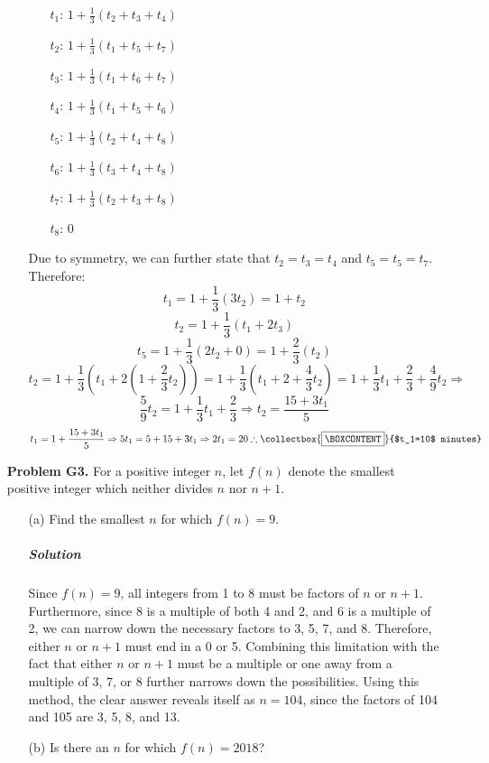 \documentclass[10pt,a4paper]{article}
\newcommand{\mybox}{%
	\collectbox{%
		\setlength{\fboxsep}{3pt}%
		\fbox{\BOXCONTENT}%
	}%
}
\begin{document}
\begin{itemize}
\begin{enumerate}
			\begin{itemize}
				\item[$t_1$:] 
				$1 + \frac{1}{3}(t_2+t_3+t_4)$
				\item[$t_2$:] 
				$1 + \frac{1}{3}(t_1+t_5+t_7)$
				\item[$t_3$:] 
				$1 + \frac{1}{3}(t_1+t_6+t_7)$
				\item[$t_4$:] 
				$1 + \frac{1}{3}(t_1+t_5+t_6)$
				\item[$t_5$:] 
				$1 + \frac{1}{3}(t_2+t_4+t_8)$
				\item[$t_6$:] 
				$1 + \frac{1}{3}(t_3+t_4+t_8)$
				\item[$t_7$:] 
				$1 + \frac{1}{3}(t_2+t_3+t_8)$
				\item[$t_8$:] 
				$0$
			\end{itemize}
		
			Due to symmetry, we can further state that $t_2=t_3=t_4$ and $t_5=t_5=t_7$. Therefore:
			\[ t_1=1+\frac{1}{3}(3t_2)=1+t_2 \]
			\[ t_2=1+\frac{1}{3}(t_1+2t_3) \]
			\[ t_5=1+\frac{1}{3}(2t_2+0)=1+\frac{2}{3}(t_2) \]
			\[ t_2=1+\frac{1}{3}(t_1+2(1+\frac{2}{3}t_2))=1+\frac{1}{3}(t_1+2+\frac{4}{3}t_2)=1+\frac{1}{3}t_1+\frac{2}{3}+\frac{4}{9}t_2\Rightarrow \]
			\[ \frac{5}{9}t_2=1+\frac{1}{3}t_1+\frac{2}{3}\Rightarrow t_2=\frac{15+3t_1}{5} \]
			\[ t_1=1+\frac{15+3t_1}{5}\Rightarrow 5t_1=5+15+3t_1\Rightarrow 2t_1=20\therefore \mybox{$t_1=10$ minutes} \]
		\end{enumerate}
	
		\item[\textbf{Problem G3.}] For a positive integer $n$, let $f(n)$ denote the smallest positive integer which neither divides $n$ nor $n+1$.
		
		\begin{enumerate}
			\item[(a)] Find the smallest $n$ for which $f(n)=9$.
			
			\subparagraph{Solution} Since $f(n)=9$, all integers from 1 to 8 must be factors of $n$ or $n+1$. Furthermore, since 8 is a multiple of both 4 and 2, and 6 is a multiple of 2, we can narrow down the necessary factors to 3, 5, 7, and 8. Therefore, either $n$ or $n+1$ must end in a 0 or 5. Combining this limitation with the fact that either $n$ or $n+1$ must be a multiple or one away from a multiple of 3, 7, or 8 further narrows down the possibilities. Using this method, the clear answer reveals itself as \mybox{$n=104$}, since the factors of 104 and 105 are 3, 5, 8, and 13.
			
			\item[(b)] Is there an $n$ for which $f(n)=2018$?
			

\end{enumerate}
\end{itemize}
\end{document}
